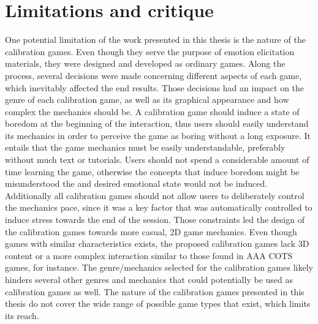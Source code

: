 \chapter{Limitations and critique}
\label{ch:limitations}

One potential limitation of the work presented in this thesis is the nature of the calibration games. Even though they serve the purpose of emotion elicitation materials, they were designed and developed as ordinary games. Along the process, several decisions were made concerning different aspects of each game, which inevitably affected the end results. Those decisions had an impact on the genre of each calibration game, as well as its graphical appearance and how complex the mechanics should be. A calibration game should induce a state of boredom at the beginning of the interaction, thus users should easily understand its mechanics in order to perceive the game as boring without a long exposure. It entails that the game mechanics must be easily understandable, preferably without much text or tutorials. Users should not spend a considerable amount of time learning the game, otherwise the concepts that induce boredom might be misunderstood the and desired emotional state would not be induced. Additionally all calibration games should not allow users to deliberately control the mechanics pace, since it was a key factor that was automatically controlled to induce stress towards the end of the session. Those constraints led the design of the calibration games towards more casual, 2D game mechanics. Even though games with similar characteristics exists, the proposed calibration games lack 3D content or a more complex interaction similar to those found in AAA COTS games, for instance. The genre/mechanics selected for the calibration games likely hinders several other genres and mechanics that could potentially be used as calibration games as well. The nature of the calibration games presented in this thesis do not cover the wide range of possible game types that exist, which limits its reach.

